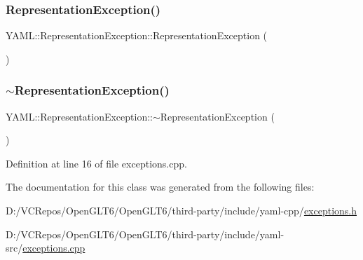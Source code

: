 \subsubsection{\texorpdfstring{RepresentationException()}{RepresentationException()}\hspace{0.1cm}{\footnotesize\ttfamily [2/2]}}
{\footnotesize\ttfamily Y\+A\+M\+L\+::\+Representation\+Exception\+::\+Representation\+Exception (\begin{DoxyParamCaption}\item[{const \mbox{\hyperlink{class_y_a_m_l_1_1_representation_exception}{Representation\+Exception}} \&}]{ }\end{DoxyParamCaption})\hspace{0.3cm}{\ttfamily [default]}}

\mbox{\label{class_y_a_m_l_1_1_representation_exception_a4dfd83460bca723f60f041e6948dca5e}} 
\subsubsection{\texorpdfstring{$\sim$RepresentationException()}{~RepresentationException()}}
{\footnotesize\ttfamily Y\+A\+M\+L\+::\+Representation\+Exception\+::$\sim$\+Representation\+Exception (\begin{DoxyParamCaption}{ }\end{DoxyParamCaption})\hspace{0.3cm}{\ttfamily [virtual]}}



Definition at line 16 of file exceptions.\+cpp.



The documentation for this class was generated from the following files\+:\begin{DoxyCompactItemize}
\item 
D\+:/\+V\+C\+Repos/\+Open\+G\+L\+T6/\+Open\+G\+L\+T6/third-\/party/include/yaml-\/cpp/\mbox{\hyperlink{exceptions_8h}{exceptions.\+h}}\item 
D\+:/\+V\+C\+Repos/\+Open\+G\+L\+T6/\+Open\+G\+L\+T6/third-\/party/include/yaml-\/src/\mbox{\hyperlink{exceptions_8cpp}{exceptions.\+cpp}}\end{DoxyCompactItemize}
